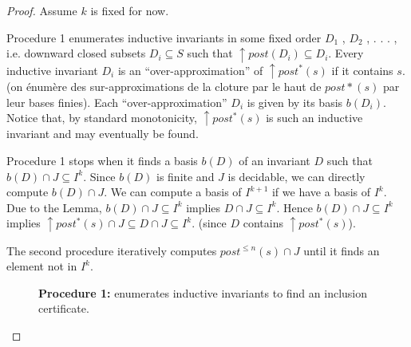 \begin{proof}
Assume $k$ is fixed for now.

Procedure 1 enumerates inductive invariants in some fixed order $D_1$ , $D_2$ , . . . , i.e. downward closed subsets $D_i \subseteq S$ such that $\uparrow post(D_i ) \subseteq D_i$. 
Every inductive invariant $D_i$ is an “over-approximation” of $\uparrow post^*(s)$ if it contains $s$.
(on énumère des sur-approximations de la cloture par le haut de $post*(s)$ par leur bases finies).
Each “over-approximation” $D_i$ is given by its basis $b(D_i)$. Notice that, by standard monotonicity, $\uparrow post^*(s)$ is such an inductive invariant and may
eventually be found.


Procedure 1 stops when it finds a basis $b(D)$ of an invariant $D$ such that
$b(D)  \cap J \subseteq I^k$.  Since $b(D)$ is finite and $J$ is decidable, we can
directly compute $b(D)  \cap J$.
We can compute a basis
of $I^{k+1}$ if we have a basis of $I^k$. %
Due to the Lemma, 
$b(D)  \cap J \subseteq I^k$ implies
$D  \cap J \subseteq I^k$.
Hence
$b(D)  \cap J \subseteq I^k$ implies
$\uparrow post^*(s) \cap J \subseteq D  \cap J \subseteq I^k$.
(since $D$ contains $ \uparrow post^*(s)$).



The second procedure iteratively computes
$post^{\leq n}(s) \cap J$
until it finds an element
not in $ I^k$.







\begin{figure}
	\caption{\textbf{Procedure 1:} enumerates inductive invariants to find an inclusion certificate.}\label{procedure1}
\end{figure}





\end{proof}

